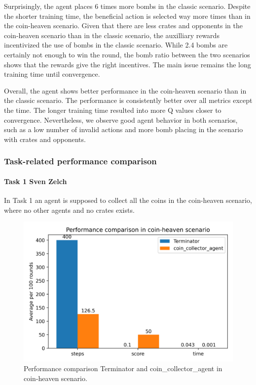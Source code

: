 \documentclass[
	letterpaper, %
	12pt, %
]{CSUniSchoolLabReport}
\begin{document}
Surprisingly, the agent places 6 times more bombs in the classic scenario. Despite the shorter training time,
the beneficial action is selected way more times than in the coin-heaven scenario. Given that there are less
crates and opponents in the coin-heaven scenario than in the classic scenario, the auxilliary rewards incentivized
the use of bombs in the classic scenario. While 2.4 bombs are certainly not enough to win the round,
the bomb ratio between the two scenarios shows that the rewards give the right incentives. The main issue remains
the long training time until convergence.


Overall, the agent shows better performance in the coin-heaven scenario than in
the classic scenario. The performance is consistently better over all metrics except the time.
The longer training time resulted into more Q values closer to convergence. Nevertheless,
we observe good agent behavior in both scenarios, such as a low number of invalid actions and more bomb placing in
the scenario with crates and opponents.


\subsubsection{Task-related performance comparison}
\paragraph{Task 1 \tiny Sven Zelch}

In Task 1 an agent is supposed to collect all the coins in the coin-heaven scenario, where no other agents and no crates exists.


\begin{figure}[h]
	\centering
	\includegraphics[scale=0.6]{Figures/Task1.png}
	\caption{Performance comparison Terminator and coin\_collector\_agent in coin-heaven scenario.}
	\label{img:Task1}
\end{figure}
\end{document}
